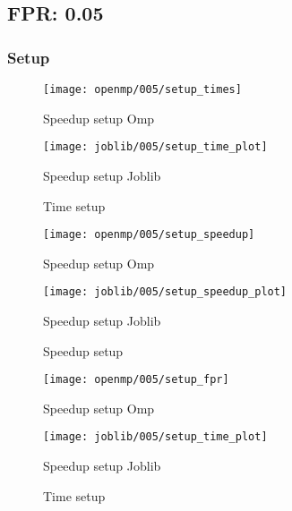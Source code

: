 \subsection{FPR: 0.05}\label{subsec:fpr-005}

\subsubsection{Setup}\label{subsubsec:fpr-005-setup}
\begin{figure}[H]
    \centering
    \texttt{[image: openmp/005/setup\_times]}
        \caption{Speedup setup Omp}\label{fig:005-setup_time_omp}
    \endminipage\hfill
    \texttt{[image: joblib/005/setup\_time\_plot]}
        \caption{Speedup setup Joblib}\label{fig:005-setup_time_joblib}
    \endminipage\hfill
    \caption{Time setup}
\end{figure}
\begin{figure}[H]
    \centering
    \texttt{[image: openmp/005/setup\_speedup]}
        \caption{Speedup setup Omp}\label{fig:005-setup_speedup_omp}
    \endminipage\hfill
    \texttt{[image: joblib/005/setup\_speedup\_plot]}
        \caption{Speedup setup Joblib}\label{fig:005-setup_speedup_joblib}
    \endminipage\hfill
    \caption{Speedup setup}
\end{figure}
\begin{figure}[H]
    \centering
    \texttt{[image: openmp/005/setup\_fpr]}
        \caption{Speedup setup Omp}\label{fig:005-setup_fpr_omp}
    \endminipage\hfill
    \texttt{[image: joblib/005/setup\_time\_plot]}
        \caption{Speedup setup Joblib}\label{fig:005-setup_fpr_joblib}
    \endminipage\hfill
    \caption{Time setup}
\end{figure}
